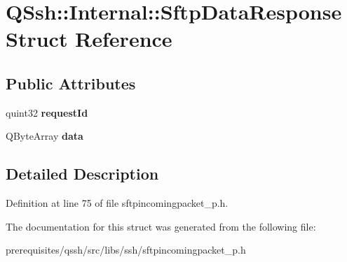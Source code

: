 \hypertarget{struct_q_ssh_1_1_internal_1_1_sftp_data_response}{}\section{Q\+Ssh\+:\+:Internal\+:\+:Sftp\+Data\+Response Struct Reference}
\label{struct_q_ssh_1_1_internal_1_1_sftp_data_response}
\subsection*{Public Attributes}
\begin{DoxyCompactItemize}
\item 
\mbox{\label{struct_q_ssh_1_1_internal_1_1_sftp_data_response_a9bd1218fcc9ad8a1b7d0627185b9c426}} 
quint32 {\bfseries request\+Id}
\item 
\mbox{\label{struct_q_ssh_1_1_internal_1_1_sftp_data_response_ab06e178e5e53fb10d50db17037e2bc10}} 
Q\+Byte\+Array {\bfseries data}
\end{DoxyCompactItemize}


\subsection{Detailed Description}


Definition at line 75 of file sftpincomingpacket\+\_\+p.\+h.



The documentation for this struct was generated from the following file\+:\begin{DoxyCompactItemize}
\item 
prerequisites/qssh/src/libs/ssh/sftpincomingpacket\+\_\+p.\+h\end{DoxyCompactItemize}
